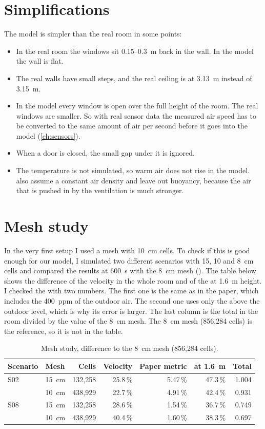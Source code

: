 \section{Simplifications}
The model is simpler than the real room in some points:
\begin{itemize}
  \item In the real room the windows sit 0.15--0.3~m back in the wall. In the model the wall is flat.
  \item The real walls have small steps, and the real ceiling is at 3.13~m instead of 3.15~m.
  \item In the model every window is open over the full height of the room. The real windows are smaller.
        So with real sensor data the measured air speed has to be converted to the same amount of air per
        second before it goes into the model (\cref{ch:sensors}).
  \item When a door is closed, the small gap under it is ignored.
  \item The temperature is not simulated, so warm air does not rise in the model. \citet{bian2025} also assume
        a constant air density and leave out buoyancy, because the air that is pushed in by the ventilation is much
        stronger.
\end{itemize}

\section{Mesh study}
In the very first setup I used a mesh with 10~cm cells. To check if this is good enough for our model, I
simulated two different scenarios with 15, 10 and 8~cm cells and compared the results at 600~s with the 8~cm
mesh (). The table below shows the difference of the velocity in the whole room and of the
\cotwo{} at 1.6~m height. I checked the \cotwo{} with two numbers. The first one is the same as in the paper,
which includes the 400~ppm of the outdoor air. The second one uses only the \cotwo{} above the outdoor level,
which is why its error is larger. The last column is the total \cotwo{} in the room divided by the value
of the 8~cm mesh. The 8~cm mesh (856,284 cells) is the reference, so it is not in the table.

\begin{table}[h]
  \centering
  \caption{Mesh study, difference to the 8~cm mesh (856,284 cells).}
  \label{tab:mesh}
  \begin{tabular}{llrrrrr}
    \toprule
    Scenario & Mesh & Cells & Velocity & Paper metric & \cotwo{} at 1.6~m & Total \cotwo{}\\
    \midrule
    S02 & 15~cm & 132,258 & 25.8\,\% & 5.47\,\% & 47.3\,\% & 1.004\\
        & 10~cm & 438,929 & 22.7\,\% & 4.91\,\% & 42.4\,\% & 0.931\\
    S08 & 15~cm & 132,258 & 28.6\,\% & 1.54\,\% & 36.7\,\% & 0.749\\
        & 10~cm & 438,929 & 40.4\,\% & 1.60\,\% & 38.3\,\% & 0.697\\
    \bottomrule
  \end{tabular}
\end{table}

